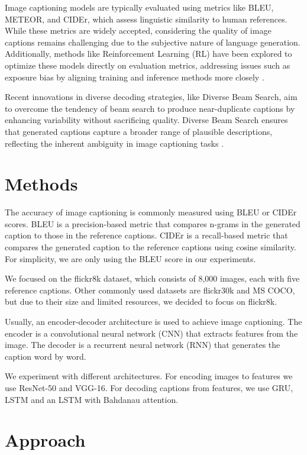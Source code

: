 \documentclass[12pt]{article}
\theoremstyle{plain}
\theoremstyle{definition}
\theoremstyle{remark}
\begin{document}
Image captioning models are typically evaluated using metrics like BLEU, METEOR, and CIDEr, which assess linguistic similarity to human references. While these metrics are widely accepted, considering the quality of image captions remains challenging due to the subjective nature of language generation. Additionally, methods like Reinforcement Learning (RL) have been explored to optimize these models directly on evaluation metrics, addressing issues such as exposure bias by aligning training and inference methods more closely \cite{Rennie}.

Recent innovations in diverse decoding strategies, like Diverse Beam Search, aim to overcome the tendency of beam search to produce near-duplicate captions by enhancing variability without sacrificing quality. Diverse Beam Search ensures that generated captions capture a broader range of plausible descriptions, reflecting the inherent ambiguity in image captioning tasks \cite{Vijayakumar}.

\section{Methods}
\label{sec:methods}

The accuracy of image captioning is commonly measured using BLEU or CIDEr scores. BLEU is a precision-based metric that compares n-grams in the generated caption to those in the reference captions. CIDEr is a recall-based metric that compares the generated caption to the reference captions using cosine similarity. For simplicity, we are only using the BLEU score in our experiments.

We focused on the flickr8k dataset, which consists of 8,000 images, each with five reference captions. Other commonly used datasets are flickr30k and MS COCO, but due to their size and limited resources, we decided to focus on flickr8k.

Usually, an encoder-decoder architecture is used to achieve image captioning. The encoder is a convolutional neural network (CNN) that extracts features from the image. The decoder is a recurrent neural network (RNN) that generates the caption word by word.

We experiment with different architectures. For encoding images to features we use ResNet-50 and VGG-16. For decoding captions from features, we use GRU, LSTM and an LSTM with Bahdanau attention.

\section{Approach}
\label{sec:approach}
\end{document}
